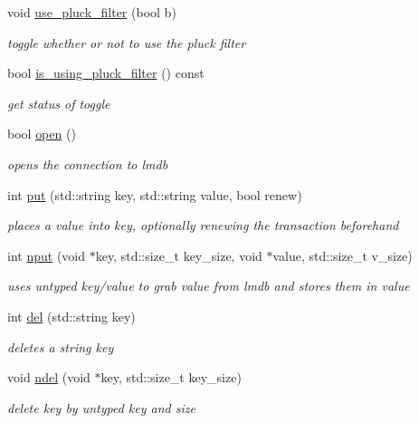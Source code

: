 \begin{DoxyCompactItemize}
void \hyperlink{structmods_1_1lmdb_1_1__db__handle_abc6d0f79407e4bc1893dedd4005d214c}{use\+\_\+pluck\+\_\+filter} (bool b)
\begin{DoxyCompactList}\small\item\em toggle whether or not to use the pluck filter \end{DoxyCompactList}\item 
bool \hyperlink{structmods_1_1lmdb_1_1__db__handle_ae6943acbfe888c2e2d0cd58ac2d8ec3d}{is\+\_\+using\+\_\+pluck\+\_\+filter} () const
\begin{DoxyCompactList}\small\item\em get status of toggle \end{DoxyCompactList}\item 
bool \hyperlink{structmods_1_1lmdb_1_1__db__handle_a804027c6192e3b7139482749c75f8ee3}{open} ()
\begin{DoxyCompactList}\small\item\em opens the connection to lmdb \end{DoxyCompactList}\item 
int \hyperlink{structmods_1_1lmdb_1_1__db__handle_adb4c07593c271ae3a064a305a2e0fb63}{put} (std\+::string key, std\+::string value, bool renew)
\begin{DoxyCompactList}\small\item\em places a value into key, optionally renewing the transaction beforehand \end{DoxyCompactList}\item 
int \hyperlink{structmods_1_1lmdb_1_1__db__handle_a0ed32a4279b6f5d2208bd0b9304cee35}{nput} (void $\ast$key, std\+::size\+\_\+t key\+\_\+size, void $\ast$value, std\+::size\+\_\+t v\+\_\+size)
\begin{DoxyCompactList}\small\item\em uses untyped key/value to grab value from lmdb and stores them in value \end{DoxyCompactList}\item 
int \hyperlink{structmods_1_1lmdb_1_1__db__handle_a099cccc7f73edc949771274ba8ecaa13}{del} (std\+::string key)
\begin{DoxyCompactList}\small\item\em deletes a string key \end{DoxyCompactList}\item 
void \hyperlink{structmods_1_1lmdb_1_1__db__handle_afed682f1c1b4481e3d94785a96c361bb}{ndel} (void $\ast$key, std\+::size\+\_\+t key\+\_\+size)
\begin{DoxyCompactList}\small\item\em delete key by untyped key and size \end{DoxyCompactList}\item 

\end{DoxyCompactItemize}
